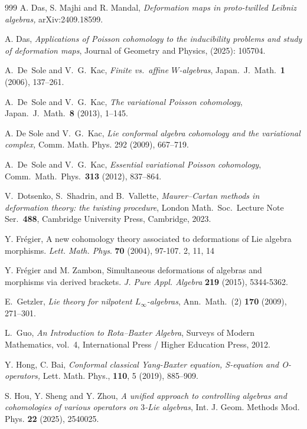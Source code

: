 \documentclass[a4paper,11pt]{article}
\numberwithin{equation}{section}
\begin{document}
\begin{thebibliography}{999}
A. Das, S. Majhi and R. Mandal,
\textit{Deformation maps in proto-twilled Leibniz algebras,}
arXiv:2409.18599.

A. Das, 
\emph{Applications of Poisson cohomology to the inducibility problems and study of deformation maps}, 
Journal of Geometry and Physics, (2025): 105704.

A.~De~Sole and V.~G.~Kac,
\emph{Finite vs.\ affine $W$-algebras},
Japan.\ J.\ Math.\ \textbf{1} (2006), 137--261.

A.~De~Sole and V.~G.~Kac,
\emph{The variational Poisson cohomology},
Japan.\ J.\ Math.\ \textbf{8} (2013), 1--145.

A. De Sole and V.~G.~Kac, \textit{Lie conformal algebra cohomology and the variational complex,} Comm. Math.
Phys. 292 (2009), 667--719. 

A.~De~Sole and V.~G.~Kac,
\emph{Essential variational Poisson cohomology},
Comm.\ Math.\ Phys.\ \textbf{313} (2012), 837--864.

V.~Dotsenko, S.~Shadrin, and B.~Vallette,
\emph{Maurer--Cartan methods in deformation theory: the twisting procedure},
London Math.\ Soc.\ Lecture Note Ser.\ \textbf{488},
Cambridge University Press, Cambridge, 2023.

 Y. Fr\'egier, A new cohomology theory associated to deformations of Lie algebra morphisms. \textit{Lett. Math. Phys}.
\textbf{70} (2004), 97-107. 2, 11, 14

 Y. Fr\'egier and M. Zambon, Simultaneous deformations of algebras and morphisms via derived brackets. \textit{J. Pure
Appl. Algebra} \textbf{219} (2015), 5344-5362.

E.~Getzler,
\emph{Lie theory for nilpotent $L_\infty$-algebras},
Ann.\ Math.\ (2) \textbf{170} (2009), 271--301.

L.~Guo,
\textit{An Introduction to Rota--Baxter Algebra},
Surveys of Modern Mathematics, vol.~4,
International Press / Higher Education Press, 2012.

Y. Hong, C.  Bai,  \textit{Conformal classical Yang-Baxter equation, S-equation and O-operators,} Lett. Math. Phys., \textbf{110}, 5 (2019), 885--909.

S. Hou, Y. Sheng and Y. Zhou,
\emph{A unified approach to controlling algebras and cohomologies of various operators on $3$-Lie algebras},
Int. J. Geom. Methods Mod. Phys. \textbf{22} (2025), 2540025.


\end{thebibliography}
\end{document}
